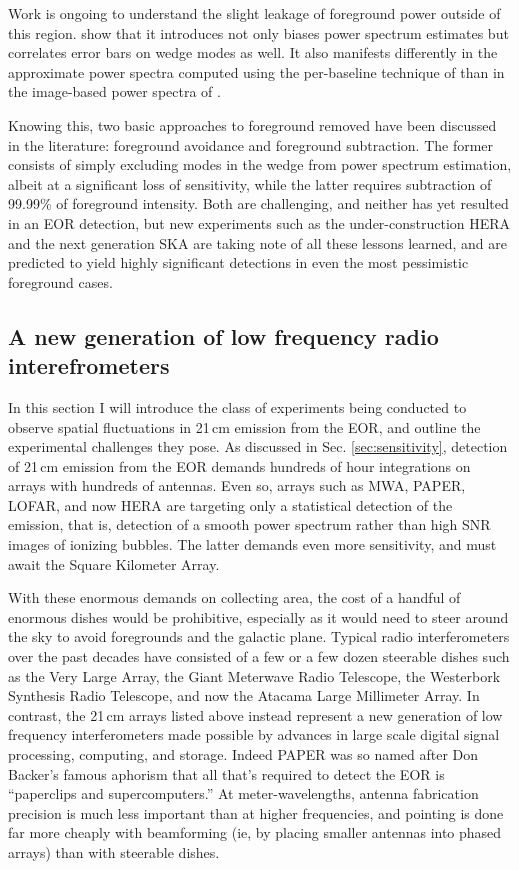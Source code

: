 Work is ongoing to understand the slight leakage of foreground power outside of this region. \citet{AdrianWedge1,AdrianWedge2} show that it introduces not only biases power spectrum estimates but correlates error bars on wedge modes as well. It also manifests differently \citep{pober13} in the approximate power spectra computed using the per-baseline technique of \citet{parsonsandbacker,parsons12b} than in the image-based power spectra of \citep{beardsley16,dillonneben,X13}. 

Knowing this, two basic approaches to foreground removed have been discussed in the literature: foreground avoidance and foreground subtraction. The former consists of simply excluding modes in the wedge from power spectrum estimation, albeit at a significant loss of sensitivity, while the latter requires subtraction of 99.99\% of foreground intensity. Both are challenging, and neither has yet resulted in an EOR detection, but new experiments such as the under-construction HERA \citep{neben16,ewallwice16,nithya16,deboer16,patra16} and the next generation SKA \citep{ska,ska1,ska2,ska3} are taking note of all these lessons learned, and are predicted to yield highly significant detections in even the most pessimistic foreground cases. 

\subsection{A new generation of low frequency radio interefrometers}

In this section I will introduce the class of experiments being conducted to observe spatial fluctuations in 21\,cm emission from the EOR, and outline the experimental challenges they pose. As discussed in Sec. \ref{sec:sensitivity}, detection of 21\,cm emission from the EOR demands hundreds of hour integrations on arrays with hundreds of antennas. Even so, arrays such as MWA, PAPER, LOFAR, and now HERA are targeting only a statistical detection of the emission, that is, detection of a smooth power spectrum rather than high SNR images of ionizing bubbles. The latter demands even more sensitivity, and must await the Square Kilometer Array.

With these enormous demands on collecting area, the cost of a handful of enormous dishes would be prohibitive, especially as it would need to steer around the sky to avoid foregrounds and the galactic plane. Typical radio interferometers over the past decades have consisted of a few or a few dozen steerable dishes such as the Very Large Array, the Giant Meterwave Radio Telescope, the Westerbork Synthesis Radio Telescope, and now the Atacama Large Millimeter Array. In contrast, the 21\,cm arrays listed above instead represent a new generation of low frequency interferometers made possible by advances in large scale digital signal processing, computing, and storage. Indeed PAPER was so named after Don Backer's famous aphorism that all that's required to detect the EOR is ``paperclips and supercomputers.'' At meter-wavelengths, antenna fabrication precision is much less important than at higher frequencies, and pointing is done far more cheaply with beamforming (ie, by placing smaller antennas into phased arrays) than with steerable dishes. 

